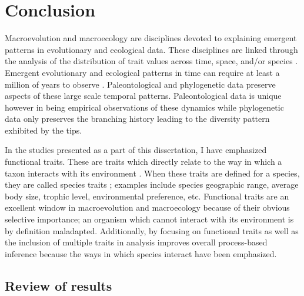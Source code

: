 \chapter{Conclusion} \label{ch:conclusion}



Macroevolution and macroecology are disciplines devoted to explaining emergent patterns in evolutionary and ecological data. These disciplines are linked through the analysis of the distribution of trait values across time, space, and/or species \citep{Mcgill2006,Weber2017}. Emergent evolutionary and ecological patterns in time can require at least a million of years to observe \citep{Uyeda2011a}. Paleontological and phylogenetic data preserve aspects of these large scale temporal patterns. Paleontological data is unique however in being empirical observations of these dynamics while phylogenetic data only preserves the branching history leading to the diversity pattern exhibited by the tips.

In the studies presented as a part of this dissertation, I have emphasized functional traits. These are traits which directly relate to the way in which a taxon interacts with its environment \citep{Mcgill2006}. When these traits are defined for a species, they are called species traits \citep{Mcgill2006}; examples include species geographic range, average body size, trophic level, environmental preference, etc. Functional traits are an excellent window in macroevolution and macroecology because of their obvious selective importance; an organism which cannot interact with its environment is by definition maladapted. Additionally, by focusing on functional traits as well as the inclusion of multiple traits in analysis improves overall process-based inference because the ways in which species interact have been emphasized.


\section{Review of results}

